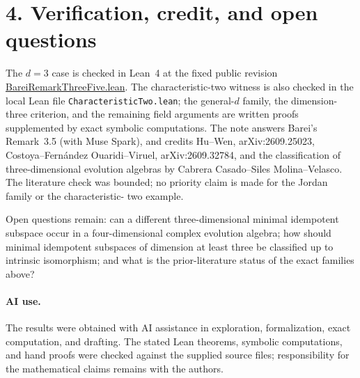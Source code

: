 \documentclass[11pt]{article}
\begin{document}
\section*{4. Verification, credit, and open questions}
The $d=3$ case is checked in Lean~4 at the fixed public revision
\href{https://github.com/the-omega-institute/trureturing/blob/097b962bd9b66d76d3886e544945f4dc6d080797/D5/S3/QuadraticForms/EvolutionAlgebras/BareiRemarkThreeFive.lean}{BareiRemarkThreeFive.lean}.
The characteristic-two witness is also checked in the local Lean file
\texttt{CharacteristicTwo.lean}; the general-$d$ family, the dimension-three
criterion, and the remaining field arguments are written proofs supplemented
by exact symbolic computations.  The note answers Barei's Remark~3.5 (with Muse Spark), and
credits Hu--Wen, arXiv:2609.25023, Costoya--Fernández Ouaridi--Viruel,
arXiv:2609.32784, and the classification of three-dimensional evolution
algebras by Cabrera Casado--Siles Molina--Velasco.  The literature check was
bounded; no priority claim is made for the Jordan family or the characteristic-
two example.

Open questions remain: can a different three-dimensional minimal idempotent
subspace occur in a four-dimensional complex evolution algebra; how should
minimal idempotent subspaces of dimension at least three be classified up to
intrinsic isomorphism; and what is the prior-literature status of the exact
families above?

\paragraph{AI use.} The results were obtained with AI assistance in exploration,
formalization, exact computation, and drafting.  The stated Lean theorems,
symbolic computations, and hand proofs were checked against the supplied
source files; responsibility for the mathematical claims remains with the
authors.
\end{document}
